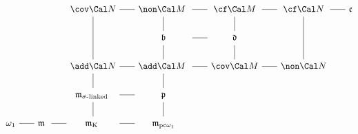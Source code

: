 $$\vbox{\offinterlineskip
\halign{\hfil#\hfil&\hfil#\hfil&\hfil#\hfil&\hfil#\hfil
  &\hfil#\hfil&\hfil#\hfil&\hfil#\hfil&\hfil#\hfil&\hfil#\hfil
  &\hfil#\hfil&\hfil#\hfil&\hfil#\hfil&\hfil#\hfil\cr
&\tmpstrut&&&$\cov\Cal N$&\tmphrule&$\non\Cal M$
  &\tmphrule&$\cf\Cal M$&\tmphrule&$\cf\Cal N$&\tmphrule&$\frak c$\cr
&\tmpstrut&&&\vrule&&\vrule&&\vrule&&\vrule\cr
&\tmpstrut&&&\vrule&&$\frak b$&\tmphrule&$\frak d$&&\vrule\cr
&\tmpstrut&&&\vrule&&\vrule&&\vrule&&\vrule\cr
&\tmpstrut&&&$\add\Cal N$&\tmphrule&$\add\Cal M$
  &\tmphrule&$\cov\Cal M$&\tmphrule&$\non\Cal N$\cr
&\tmpstrut&&&\vrule&&\vrule\cr
&\tmpstrut&&&$\frak m_{\sigma\text{-linked}}$
  &\tmphrule&$\frak p$\cr
&\tmpstrut&&&\vrule&&\vrule\cr
$\tmpstrut\omega_1$&\tmphrule&$\frak m$
  &\tmphrule&$\frak m_{\text{K}}$
  &\tmphrule&$\frak m_{\text{pc}\omega_1}$\cr
}}$$

